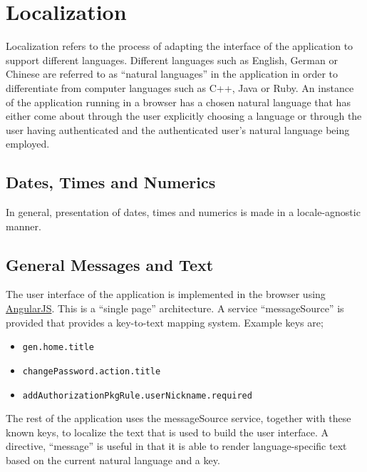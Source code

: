 
\section{Localization}

Localization refers to the process of adapting the interface of the application to support different languages.  Different languages such as English, German or Chinese are referred to as ``natural languages'' in the application in order to differentiate from computer languages such as C++, Java or Ruby.  An instance of the application running in a browser has a chosen natural language that has either come about through the user explicitly choosing a language or through the user having authenticated and the authenticated user's natural language being employed.

\subsection{Dates, Times and Numerics}

In general, presentation of dates, times and numerics is made in a locale-agnostic manner.

\subsection{General Messages and Text}

The user interface of the application is implemented in the browser using \href{http://www.angularjs.org/}{AngularJS}.  This is a ``single page'' architecture.  A service ``messageSource'' is provided that provides a key-to-text mapping system.  Example keys are;

\begin{itemize}
\item {\tt gen.home.title}
\item {\tt changePassword.action.title}
\item {\tt addAuthorizationPkgRule.userNickname.required}
\end{itemize}

The rest of the application uses the messageSource service, together with these known keys, to localize the text that is used to build the user interface.  A directive, ``message'' is useful in that it is able to render language-specific text based on the current natural language and a key.

